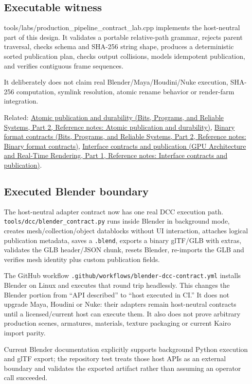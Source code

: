 \subsection{Executable witness}\label{appendix-03ade9e1875f-executable-witness}

\hypertarget{appendix-03ade9e1875f-executable-witness}{}

tools/labs/production\_pipeline\_contract\_lab.cpp implements the host-neutral part of this design. It validates a portable relative-path grammar, rejects parent traversal, checks schema and SHA-256 string shape, produces a deterministic sorted publication plan, checks output collisions, models idempotent publication, and verifies contiguous frame sequences.

It deliberately does not claim real Blender/Maya/Houdini/Nuke execution, SHA-256 computation, symlink resolution, atomic rename behavior or render-farm integration.

Related: \href{../01-Bits-Programs-and-Reliable-Systems-P02/main.pdf\#nameddest=appendix-e89a8f290ef5}{Atomic publication and durability (Bits, Programs, and Reliable Systems, Part 2, Reference notes: Atomic publication and durability)}, \href{../01-Bits-Programs-and-Reliable-Systems-P02/main.pdf\#nameddest=appendix-590bbb2424c1}{Binary format contracts (Bits, Programs, and Reliable Systems, Part 2, Reference notes: Binary format contracts)}, \href{../06-GPU-Architecture-and-Real-Time-Rendering-P01/main.pdf\#nameddest=appendix-fdae7ff0a23f}{Interface contracts and publication (GPU Architecture and Real-Time Rendering, Part 1, Reference notes: Interface contracts and publication)}.

\subsection{Executed Blender boundary}\label{appendix-03ade9e1875f-executed-blender-boundary}

\hypertarget{appendix-03ade9e1875f-executed-blender-boundary}{}

The host-neutral adapter contract now has one real DCC execution path. \texttt{tools/dcc/blender\_contract.py} runs inside Blender in background mode, creates mesh/collection/object datablocks without UI interaction, attaches logical publication metadata, saves a \texttt{.blend}, exports a binary glTF/GLB with extras, validates the GLB header/JSON chunk, resets Blender, re-imports the GLB and verifies mesh identity plus custom publication fields.

The GitHub workflow \texttt{.github/workflows/blender-dcc-contract.yml} installs Blender on Linux and executes that round trip headlessly. This changes the Blender portion from ``API described'' to ``host executed in CI.'' It does not upgrade Maya, Houdini or Nuke: their adapters remain host-neutral contracts until a licensed/current host can execute them. It also does not prove arbitrary production scenes, armatures, materials, texture packaging or current Kairo import parity.

Current Blender documentation explicitly supports background Python execution and glTF export; the repository test treats those host APIs as an external boundary and validates the exported artifact rather than assuming an operator call succeeded.
